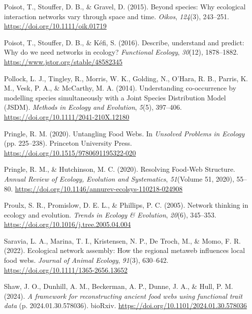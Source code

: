 \documentclass[
]{article}
\newlength{\cslhangindent}
\newenvironment{CSLReferences}[2] %
 {\begin{list}{}{%
  \setlength{\itemindent}{0pt}
  \setlength{\leftmargin}{0pt}
  \setlength{\parsep}{0pt}
  \ifodd #1
   \setlength{\leftmargin}{\cslhangindent}
   \setlength{\itemindent}{-1\cslhangindent}
  \fi
  \setlength{\itemsep}{#2\baselineskip}}}
 {\end{list}}
\begin{document}
\begin{CSLReferences}{1}{0}
Poisot, T., Stouffer, D. B., \& Gravel, D. (2015). Beyond species: Why
ecological interaction networks vary through space and time.
\emph{Oikos}, \emph{124}(3), 243--251.
\url{https://doi.org/10.1111/oik.01719}

Poisot, T., Stouffer, D. B., \& Kéfi, S. (2016). Describe, understand
and predict: Why do we need networks in ecology? \emph{Functional
Ecology}, \emph{30}(12), 1878--1882.
\url{https://www.jstor.org/stable/48582345}

Pollock, L. J., Tingley, R., Morris, W. K., Golding, N., O'Hara, R. B.,
Parris, K. M., Vesk, P. A., \& McCarthy, M. A. (2014). Understanding
co-occurrence by modelling species simultaneously with a {Joint Species
Distribution Model} ({JSDM}). \emph{Methods in Ecology and Evolution},
\emph{5}(5), 397--406. \url{https://doi.org/10.1111/2041-210X.12180}

Pringle, R. M. (2020). Untangling {Food Webs}. In \emph{Unsolved
{Problems} in {Ecology}} (pp. 225--238). Princeton University Press.
\url{https://doi.org/10.1515/9780691195322-020}

Pringle, R. M., \& Hutchinson, M. C. (2020). Resolving {Food-Web
Structure}. \emph{Annual Review of Ecology, Evolution and Systematics},
\emph{51}(Volume 51, 2020), 55--80.
\url{https://doi.org/10.1146/annurev-ecolsys-110218-024908}

Proulx, S. R., Promislow, D. E. L., \& Phillips, P. C. (2005). Network
thinking in ecology and evolution. \emph{Trends in Ecology \&
Evolution}, \emph{20}(6), 345--353.
\url{https://doi.org/10.1016/j.tree.2005.04.004}

Saravia, L. A., Marina, T. I., Kristensen, N. P., De Troch, M., \& Momo,
F. R. (2022). Ecological network assembly: {How} the regional metaweb
influences local food webs. \emph{Journal of Animal Ecology},
\emph{91}(3), 630--642. \url{https://doi.org/10.1111/1365-2656.13652}

Shaw, J. O., Dunhill, A. M., Beckerman, A. P., Dunne, J. A., \& Hull, P.
M. (2024). \emph{A framework for reconstructing ancient food webs using
functional trait data} (p. 2024.01.30.578036). bioRxiv.
\url{https://doi.org/10.1101/2024.01.30.578036}


\end{CSLReferences}
\end{document}

